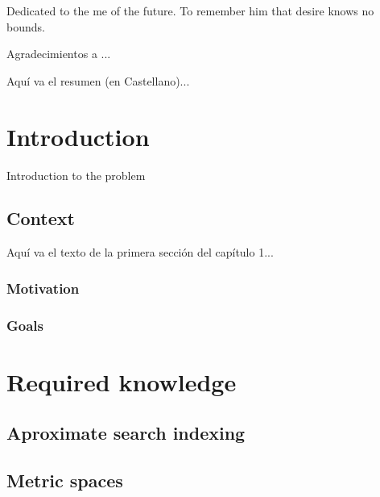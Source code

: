 \documentclass{iccmemoria}
\author{Erik Regla}
\date{mes, año}
\begin{document}
\maketitle

\begin{dedicatory}
Dedicated to the me of the future. To remember him that desire knows no bounds.
\end{dedicatory}

\begin{acknowledgment}
Agradecimientos a ...
\end{acknowledgment}

\tableofcontents
\listoffigures
\listoftables

\begin{resumen}
Aquí va el resumen (en Castellano)... 
\end{resumen}



\chapter{Introduction}
Introduction to the problem

\section{Context}
Aquí va el texto de la primera sección del capítulo 1... 

\subsection{Motivation}


\subsection{Goals}

\chapter{Required knowledge}
  \section{Aproximate search indexing}
  \section{Metric spaces}
\end{document}
